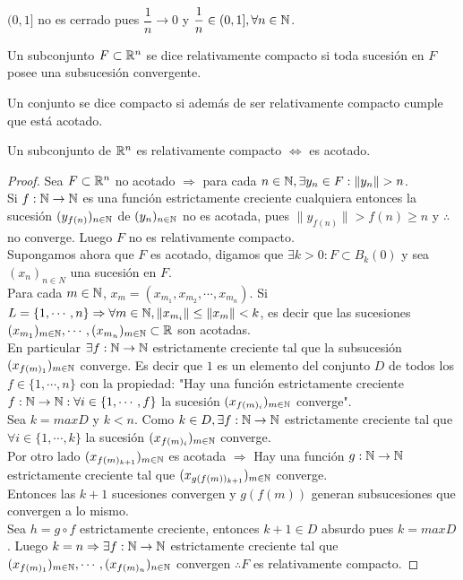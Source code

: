 \begin{eg}
  $(0, 1]$ no es cerrado pues $\dfrac{1}{n} \to 0$ y $\dfrac{1}{n} \in (0, 1], \forall n \in \mathbb{N}$.
\end{eg}

\begin{definition}
  Un subconjunto $F \subset \mathbb{R}^n$ se dice relativamente compacto si toda sucesión en $F$ posee una subsucesión convergente.
\end{definition}

\begin{definition}[Compacto]
  Un conjunto se dice compacto si además de ser relativamente compacto cumple que está acotado.
\end{definition}

\begin{prop}
  Un subconjunto de $\mathbb{R}^n$ es relativamente compacto $\iff$ es acotado.
  \begin{proof}
    Sea $F \subset \mathbb{R}^n$ no acotado $\Rightarrow$ para cada $n \in \mathbb{N}, \exists y_n \in F : \|y_n\| > n$. \\
    Si $f : \mathbb{N} \to \mathbb{N}$ es una función estrictamente creciente cualquiera entonces la sucesión $(y_{f(n)})_{n \in \mathbb{N}}$ de $(y_n)_{n \in \mathbb{N}}$ no es acotada, pues $\|y_{f(n)}\| > f(n) \geq n$ y $\therefore$ no converge. Luego $F$ no es relativamente compacto. \\

    Supongamos ahora que $F$ es acotado, digamos que $\exists k > 0 : F \subset B_k(0)$ y sea $(x_n)_{n \in N}$ una sucesión en $F$. \\
    Para cada $m \in \mathbb{N}$, $x_m = (x_{m_1}, x_{m_2}, \cdots, x_{m_n})$. Si $L = \{1, \cdots, n\} \Rightarrow \forall m \in \mathbb{N}, \|x_{m_i}\| \leq \|x_m\| < k$, es decir que las sucesiones $(x_{m_1})_{m \in \mathbb{N}}, \cdots, (x_{m_n})_{m \in \mathbb{N}} \subset \mathbb{R}$ son acotadas. \\
    En particular $\exists f: \mathbb{N} \to \mathbb{N}$ estrictamente creciente tal que la subsucesión $(x_{f(m)_1})_{m \in \mathbb{N}}$ converge. Es decir que $1$ es un elemento del conjunto $D$ de todos los $f \in \{1, \cdots, n\}$ con la propiedad: "Hay una función estrictamente creciente $f: \mathbb{N} \to \mathbb{N} : \forall i \in \{1, \cdots, f\}$ la sucesión $(x_{f(m)_i})_{m \in \mathbb{N}}$ converge". \\
    Sea $k = maxD$ y $k < n$. Como $k \in D, \exists f: \mathbb{N} \to \mathbb{N}$ estrictamente creciente tal que $\forall i \in \{1, \cdots, k\}$ la sucesión $(x_{f(m)_i})_{m \in \mathbb{N}}$ converge. \\
    Por otro lado $(x_{f(m)_{k+1}})_{m \in \mathbb{N}}$ es acotada $\Rightarrow$ Hay una función $g: \mathbb{N} \to \mathbb{N}$ estrictamente creciente tal que $(x_{g(f(m))_{k+1}})_{m \in \mathbb{N}}$ converge. \\
    Entonces las $k+1$ sucesiones convergen y $g(f(m))$ generan subsucesiones que convergen a lo mismo. \\
    Sea $h = g \circ f$ estrictamente creciente, entonces $k+1 \in D$ absurdo pues $k = maxD$. Luego $k = n \Rightarrow \exists f: \mathbb{N} \to \mathbb{N}$ estrictamente creciente tal que \\
    $(x_{f(m)_1})_{m \in \mathbb{N}}, \cdots, (x_{f(m)_n})_{n \in \mathbb{N}}$ convergen $\therefore F$ es relativamente compacto.
  \end{proof}
\end{prop}
